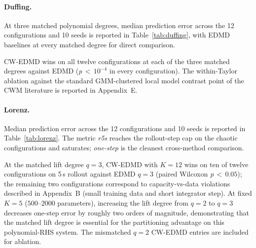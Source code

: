 \documentclass{article}
\begin{document}
\paragraph{Duffing.} At three matched polynomial degrees, median prediction error across the 12 configurations and 10 seeds is reported in Table~\ref{tab:duffing}, with EDMD baselines at every matched degree for direct comparison.
\begin{table}[H]
\caption{Duffing oscillator: median prediction error (dimensionless state-space units) across 12 configurations and 10 seeds. Top block: EDMD at four polynomial lift degrees. Bottom block: CW-EDMD at three matched lift degrees. Bold marks the column-wise minimum.}
\label{tab:duffing}
\centering\small

\end{table}
\noindent CW-EDMD wins on all twelve configurations at each of the three matched degrees against EDMD (\textit{p}\,$<\,10^{-4}$ in every configuration). The within-Taylor ablation against the standard GMM-clustered local model contrast point of the CWM literature is reported in Appendix~E.

\paragraph{Lorenz.} Median prediction error across the 12 configurations and 10 seeds is reported in Table~\ref{tab:lorenz}. The metric \emph{r5s} reaches the rollout-step cap on the chaotic configurations and saturates; \emph{one-step} is the cleanest cross-method comparison.
\begin{table}[H]
\caption{Lorenz attractor: median prediction error (dimensionless state-space units) across 12 configurations and 10 seeds. Top block: EDMD at two polynomial lift degrees. Middle block: CW-EDMD at lift degree $q{=}2$ (mismatched). Bottom block: CW-EDMD at the matched lift degree $q{=}3$. Bold marks the column-wise minimum.}
\label{tab:lorenz}
\centering\small

\end{table}
\noindent At the matched lift degree $q{=}3$, CW-EDMD with $K{=}12$ wins on ten of twelve configurations on 5\,s rollout against EDMD $q{=}3$ (paired Wilcoxon \textit{p}\,$<\,0.05$); the remaining two configurations correspond to capacity-vs-data violations described in Appendix~B (small training data and short integrator step). At fixed $K{=}5$ ($500$--$2000$ parameters), increasing the lift degree from $q{=}2$ to $q{=}3$ decreases one-step error by roughly two orders of magnitude, demonstrating that the matched lift degree is essential for the partitioning advantage on this polynomial-RHS system. The mismatched $q{=}2$ CW-EDMD entries are included for ablation.
\end{document}
